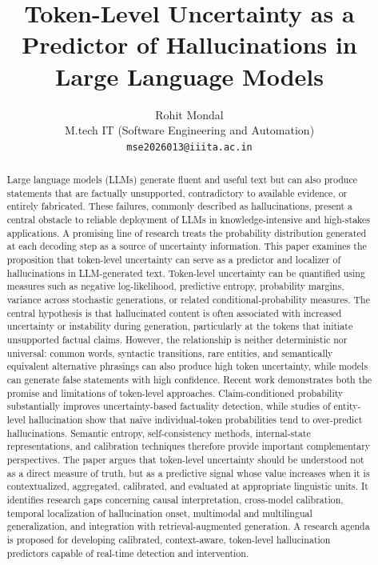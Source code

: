 \documentclass[11pt]{article}
\title{Token-Level Uncertainty as a Predictor of Hallucinations in Large Language Models}
\author{
  Rohit Mondal\\
  {M.tech IT (Software Engineering and Automation)}\\
  \texttt{mse2026013@iiita.ac.in}
}
\date{}
\begin{document}
\maketitle

\begin{abstract}
Large language models (LLMs) generate fluent and useful text but can also produce statements that are factually unsupported, contradictory to available evidence, or entirely fabricated. These failures, commonly described as hallucinations, present a central obstacle to reliable deployment of LLMs in knowledge-intensive and high-stakes applications. A promising line of research treats the probability distribution generated at each decoding step as a source of uncertainty information. This paper examines the proposition that token-level uncertainty can serve as a predictor and localizer of hallucinations in LLM-generated text. Token-level uncertainty can be quantified using measures such as negative log-likelihood, predictive entropy, probability margins, variance across stochastic generations, or related conditional-probability measures. The central hypothesis is that hallucinated content is often associated with increased uncertainty or instability during generation, particularly at the tokens that initiate unsupported factual claims. However, the relationship is neither deterministic nor universal: common words, syntactic transitions, rare entities, and semantically equivalent alternative phrasings can also produce high token uncertainty, while models can generate false statements with high confidence. Recent work demonstrates both the promise and limitations of token-level approaches. Claim-conditioned probability substantially improves uncertainty-based factuality detection, while studies of entity-level hallucination show that na\"ive individual-token probabilities tend to over-predict hallucinations. Semantic entropy, self-consistency methods, internal-state representations, and calibration techniques therefore provide important complementary perspectives. The paper argues that token-level uncertainty should be understood not as a direct measure of truth, but as a predictive signal whose value increases when it is contextualized, aggregated, calibrated, and evaluated at appropriate linguistic units. It identifies research gaps concerning causal interpretation, cross-model calibration, temporal localization of hallucination onset, multimodal and multilingual generalization, and integration with retrieval-augmented generation. A research agenda is proposed for developing calibrated, context-aware, token-level hallucination predictors capable of real-time detection and intervention.
\end{abstract}
\end{document}

